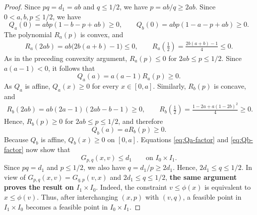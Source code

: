 \documentclass[11pt]{article}
\numberwithin{equation}{section}
\theoremstyle{definition}
\theoremstyle{remark}
\begin{document}
\begin{proof}
Since $pq=d_1=ab$ and $q\leq1/2$, we have
$p=ab/q\geq2ab$.
Since $0<a,b,p\leq1/2$, we have
\begin{equation*}
 Q_a(0)=abp(1-b-p+ab)\geq0,\qquad
 Q_b(0)=abp(1-a-p+ab)\geq0.
\end{equation*}
The polynomial $R_a(p)$ is convex, and
\begin{align*}
 R_a(2ab)
 =
 ab\bigl(2b(a+b)-1\bigr)\leq0,\qquad
 R_a\left(\frac12\right)
 =
 \frac{2b(a+b)-1}{4}\leq0.
\end{align*}
As in the preceding
convexity argument, $R_a(p)\leq0$ for $2ab\leq p\leq1/2$. Since
$a(a-1)<0$, it follows that
\begin{equation*}
 Q_a(a)=a(a-1)R_a(p)\geq0.
\end{equation*}
As $Q_a$ is affine, $Q_a(x)\geq0$ for every $x\in[0,a]$.
Similarly, $R_b(p)$ is concave, and
\begin{align*}
 R_b(2ab)
 =
 ab(2a-1)(2ab-b-1)\geq0,\qquad
 R_b\left(\frac12\right)
 =
 \frac{1-2a+a(1-2b)^2}{4}\geq0.
\end{align*}
Hence, $R_b(p)\geq0$ for $2ab\leq p\leq1/2$, and therefore
\begin{equation*}
 Q_b(a)=aR_b(p)\geq0.
\end{equation*}
Because $Q_b$ is affine, $Q_b(x)\geq0$ on $[0,a]$.
Equations \eqref{eq:Qa-factor} and \eqref{eq:Qb-factor} now show that
\begin{equation*}
 G_{p,q}(x,v)\leq d_1
 \qquad\text{on }I_0\times I_1.
\end{equation*}
Since $pq=d_1$ and $p\leq1/2$, we also have
$q=d_1/p\geq2d_1$. Hence, $2d_1\leq q\leq1/2$.
In  view of  $G_{p,q}(x,v)=G_{q,p}(v,x)$
and $2d_1\leq q\leq1/2$, \textbf{the same argument proves the result on
$I_1\times I_0$}. Indeed, the constraint $v\leq\phi(x)$ is equivalent to
$x\leq\phi(v)$. Thus,
after interchanging $(x,p)$ with $(v,q)$, a feasible point in
$I_1\times I_0$ becomes a feasible point in $I_0\times I_1$. 



\end{proof}
\end{document}
